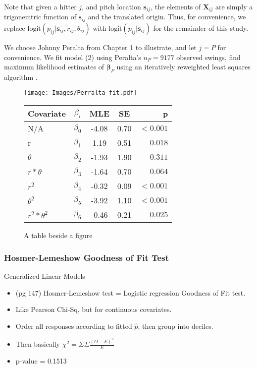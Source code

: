 \documentclass{article}
\begin{document}
Note that given a hitter $j$, and pitch location $\pmb{s}_{ij}$, the elements of $\pmb{X}_{ij}$ are simply a trigonemtric function of $\pmb{s}_{ij}$ and the translated origin. Thus, for convenience, we replace $\text{logit}(p_{ij}|\pmb{s}_{ij}, r_{ij}, \theta_{ij})$ with $\text{logit}(p_{ij}|\pmb{s}_{ij})$ for the remainder of this study.

We choose Johnny Peralta from Chapter 1 to illustrate, and let $j = P$ for convenience. We fit model (2) using Peralta's $n_{P} = 9177$ observed swings, find maximum likelihood estimates of $\pmb{\beta}_{P}$ using an iteratively reweighted least squares algorithm \citep{Myers2012}. 

  \begin{figure}[!ht]
    \centering
    \texttt{[image: Images/Perralta\_fit.pdf]}
    \qquad
\begin{tabular}[b]{ l | c | c | c | r }
    \hline
    Covariate         & $\beta_{i}$ & MLE   & SE     &      p \\ \hline \hline
    N/A               & $\beta_{0}$ & -4.08 & 0.70 & $ <0.001$ \\ \hline
    r                 & $\beta_{1}$ &  1.19 & 0.51 & $  0.018$ \\ \hline
    $\theta$          & $\beta_{2}$ & -1.93 & 1.90 & $  0.311$ \\ \hline
    $r*\theta$        & $\beta_{3}$ & -1.64 & 0.70 & $  0.064$ \\ \hline
    $r^{2}$           & $\beta_{4}$ & -0.32 & 0.09 & $ <0.001$ \\ \hline
    $\theta^{2}$      & $\beta_{5}$ & -3.92 & 1.10 & $ <0.001$ \\ \hline
    $r^{2}*\theta^{2}$& $\beta_{6}$ & -0.46 & 0.21 & $  0.025$ \\ \hline
    \hline
\end{tabular}
    \captionsetup{labelformat=andtable}
    \caption{A table beside a figure}
  \end{figure}




\subsubsection{Hosmer-Lemeshow Goodness of Fit Test} %

Generalized Linear Models \citep{Myers2012}

  \begin{itemize} %
  \item (pg 147) Hosmer-Lemeshow test = Logistic regression Goodness of Fit test. 
  \item Like Pearson Chi-Sq, but for continuous covariates. 
  \item Order all responses according to fitted $\hat{p}$, then group into deciles. 
  \item Then basically $\chi^{2} = \Sigma \Sigma \frac{(O - E)^{2}}{E}$
  \item p-value = 0.1513
  \end{itemize}
  
\end{document}
